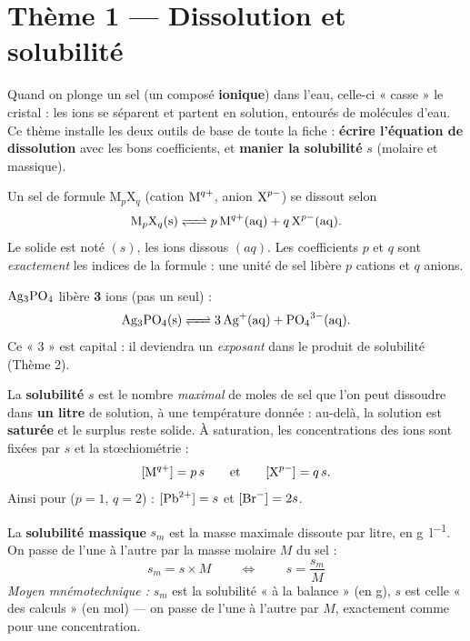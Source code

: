 \documentclass[11pt,a4paper]{article}
\begin{document}
\section*{\color{primarydark}Thème 1 — Dissolution et solubilité}

Quand on plonge un sel (un composé \textbf{ionique}) dans l'eau, celle-ci « casse » le cristal :
les ions se séparent et partent en solution, entourés de molécules d'eau. Ce thème installe les deux
outils de base de toute la fiche : \textbf{écrire l'équation de dissolution} avec les bons
coefficients, et \textbf{manier la solubilité} $s$ (molaire et massique).

\begin{cle}
Un sel de formule $\mathrm{M}_p\mathrm{X}_q$ (cation $\ce{M^{q+}}$, anion $\ce{X^{p-}}$) se dissout selon
\[ \ce{M_{p}X_{q}(s) <=> p M^{q+}(aq) + q X^{p-}(aq)}. \]
Le solide est noté $(s)$, les ions dissous $(aq)$. Les coefficients $p$ et $q$ sont \emph{exactement}
les indices de la formule : une unité de sel libère $p$ cations et $q$ anions.
\end{cle}

\begin{piege}
$\ce{Ag3PO4}$ libère \textbf{3} ions  (pas un seul) :
\[ \ce{Ag3PO4(s) <=> 3 Ag^{+}(aq) + PO4^{3-}(aq)}. \]
Ce « 3 » est capital : il deviendra un \emph{exposant} dans le produit de solubilité (Thème 2).
\end{piege}

\begin{cle}
La \textbf{solubilité} $s$ est le nombre \emph{maximal} de moles de sel que l'on peut dissoudre dans
\textbf{un litre} de solution, à une température donnée : au-delà, la solution est \textbf{saturée} et
le surplus reste solide. À saturation, les concentrations des ions sont fixées par $s$ et la
stœchiométrie :
\[ [\ce{M^{q+}}] = p\,s \qquad\text{et}\qquad [\ce{X^{p-}}] = q\,s. \]
Ainsi pour  ($p=1$, $q=2$) : $[\ce{Pb^{2+}}]=s$ et $[\ce{Br-}]=2s$.
\end{cle}

\begin{cle}
La \textbf{solubilité massique} $s_m$ est la masse maximale dissoute par litre, en \si{\gram\per\litre}.
On passe de l'une à l'autre par la masse molaire $M$ du sel :
\[ \boxed{\,s_m = s\times M\,} \qquad\Longleftrightarrow\qquad \boxed{\,s = \dfrac{s_m}{M}\,} \]
\emph{Moyen mnémotechnique :} $s_m$ est la solubilité « à la balance » (en g), $s$ est celle « des
calculs » (en mol) — on passe de l'une à l'autre par $M$, exactement comme pour une concentration.
\end{cle}
\end{document}
